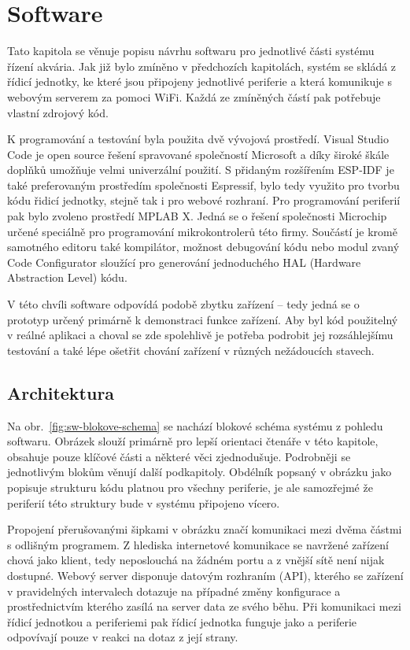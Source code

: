 \chapter{Software}
    Tato kapitola se věnuje popisu návrhu softwaru pro jednotlivé části systému řízení akvária. Jak již bylo zmíněno v předchozích kapitolách, systém se skládá z řídicí jednotky, ke které jsou připojeny jednotlivé periferie a která komunikuje s webovým serverem za pomoci WiFi. Každá ze zmíněných částí pak potřebuje vlastní zdrojový kód. 
    
    K programování a testování byla použita dvě vývojová prostředí. Visual Studio Code je open source řešení spravované společností Microsoft a díky široké škále doplňků umožňuje velmi univerzální použití. S přidaným rozšířením ESP-IDF je také preferovaným prostředím společnosti Espressif, bylo tedy využito pro tvorbu kódu řidicí jednotky, stejně tak i pro webové rozhraní. Pro programování periferií pak bylo zvoleno prostředí MPLAB X. Jedná se o řešení společnosti Microchip určené speciálně pro programování mikrokontrolerů této firmy. Součástí je kromě samotného editoru také kompilátor, možnost debugování kódu nebo modul zvaný Code Configurator sloužící pro generování jednoduchého HAL (Hardware Abstraction Level) kódu.

    V této chvíli software odpovídá podobě zbytku zařízení -- tedy jedná se o prototyp určený primárně k demonstraci funkce zařízení. Aby byl kód použitelný v reálné aplikaci a choval se zde spolehlivě je potřeba podrobit jej rozsáhlejšímu testování a také lépe ošetřit chování zařízení v různých nežádoucích stavech.   

\section{Architektura}
    Na obr.~\ref{fig:sw-blokove-schema} se nachází blokové schéma systému z pohledu softwaru. Obrázek slouží primárně pro lepší orientaci čtenáře v této kapitole, obsahuje pouze klíčové části a některé věci zjednodušuje. Podrobněji se jednotlivým blokům věnují další podkapitoly. Obdélník popsaný v obrázku jako  popisuje strukturu kódu platnou pro všechny periferie, je ale samozřejmé že periferií této struktury bude v systému připojeno vícero.

    Propojení přerušovanými šipkami v obrázku značí komunikaci mezi dvěma částmi s odlišným programem. Z hlediska internetové komunikace se navržené zařízení chová jako klient, tedy neposlouchá na žádném portu a z vnější sítě není nijak dostupné. Webový server disponuje datovým rozhraním (API), kterého se zařízení v pravidelných intervalech dotazuje na případné změny konfigurace a prostřednictvím kterého zasílá na server data ze svého běhu. Při komunikaci mezi řídicí jednotkou a periferiemi pak řídicí jednotka funguje jako  a periferie odpovívají pouze v reakci na dotaz z její strany.

